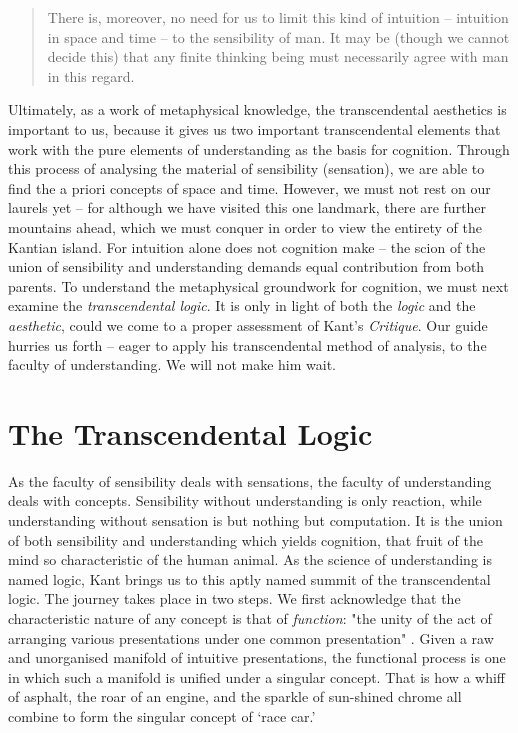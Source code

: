 \begin{quote}
  There is, moreover, no need for us to limit this kind of intuition -- intuition in space and time -- to the sensibility of man. It may be (though we cannot decide this) that any finite thinking being must necessarily agree with man in this regard.

  \autocite[B72]{hackett}
\end{quote}

\noindent
Ultimately, as a work of metaphysical knowledge, the transcendental aesthetics is important to us, because it gives us two important transcendental elements that work with the pure elements of understanding as the basis for cognition. Through this process of analysing the material of sensibility (sensation), we are able to find the a priori concepts of space and time. However, we must not rest on our laurels yet -- for although we have visited this one landmark, there are further mountains ahead, which we must conquer in order to view the entirety of the Kantian island. For intuition alone does not cognition make -- the scion of the union of sensibility and understanding demands equal contribution from both parents. To understand the metaphysical groundwork for cognition, we must next examine the \emph{transcendental logic}. It is only in light of both the \emph{logic} and the \emph{aesthetic}, could we come to a proper assessment of Kant's \emph{Critique}. Our guide hurries us forth -- eager to apply his transcendental method of analysis, to the faculty of understanding. We will not make him wait.

\section*{The Transcendental Logic}
As the faculty of sensibility deals with sensations, the faculty of understanding deals with concepts. Sensibility without understanding is only reaction, while understanding without sensation is but nothing but computation. It is the union of both sensibility and understanding which yields cognition, that fruit of the mind so characteristic of the human animal. As the science of understanding is named logic, Kant brings us to this aptly named summit of the transcendental logic. The journey takes place in two steps. We first acknowledge that the characteristic nature of any concept is that of \emph{function}: "the unity of the act of arranging various presentations under one common presentation" \autocite[B93]{hackett}. Given a raw and unorganised manifold of intuitive presentations, the functional process is one in which such a manifold is unified under a singular concept. That is how a whiff of asphalt, the roar of an engine, and the sparkle of sun-shined chrome all combine to form the singular concept of `race car.'

